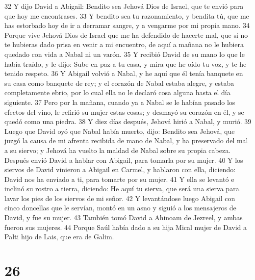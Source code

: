 32 Y dijo David a Abigail: Bendito sea Jehová Dios de Israel, que te envió para que hoy me encontrases.
33 Y bendito sea tu razonamiento, y bendita tú, que me has estorbado hoy de ir a derramar sangre, y a vengarme por mi propia mano. 
34 Porque vive Jehová Dios de Israel que me ha defendido de hacerte mal, que si no te hubieras dado prisa en venir a mi encuentro, de aquí a mañana no le hubiera quedado con vida a Nabal ni un varón.
35 Y recibió David de su mano lo que le había traído, y le dijo: Sube en paz a tu casa, y mira que he oído tu voz, y te he tenido respeto.
36 Y Abigail volvió a Nabal, y he aquí que él tenía banquete en su casa como banquete de rey; y el corazón de Nabal estaba alegre, y estaba completamente ebrio, por lo cual ella no le declaró cosa alguna hasta el día siguiente.
37 Pero por la mañana, cuando ya a Nabal se le habían pasado los efectos del vino, le refirió su mujer estas cosas; y desmayó su corazón en él, y se quedó como una piedra.
38 Y diez días después, Jehová hirió a Nabal, y murió.
39 Luego que David oyó que Nabal había muerto, dijo: Bendito sea Jehová, que juzgó la causa de mi afrenta recibida de mano de Nabal, y ha preservado del mal a su siervo; y Jehová ha vuelto la maldad de Nabal sobre su propia cabeza. Después envió David a hablar con Abigail, para tomarla por su mujer.
40 Y los siervos de David vinieron a Abigail en Carmel, y hablaron con ella, diciendo: David nos ha enviado a ti, para tomarte por su mujer.
41 Y ella se levantó e inclinó su rostro a tierra, diciendo: He aquí tu sierva, que será una sierva para lavar los pies de los siervos de mi señor.
42 Y levantándose luego Abigail con cinco doncellas que le servían, montó en un asno y siguió a los mensajeros de David, y fue su mujer.
43 También tomó David a Ahinoam de Jezreel, y ambas fueron sus mujeres.
44 Porque Saúl había dado a su hija Mical mujer de David a Palti hijo de Lais, que era de Galim.

\chapter{26}

